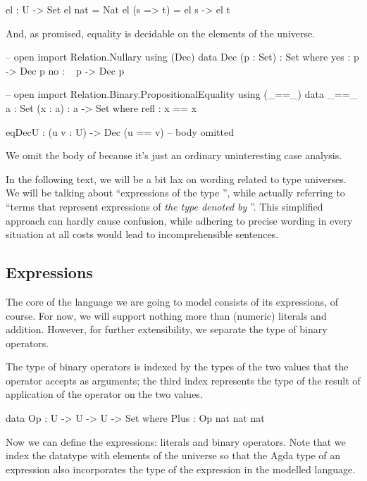 \begin{code}
  el : U -> Set
  el nat = Nat
  el (s => t) = el s -> el t
\end{code}

\noindent And, as promised, equality is decidable on the elements of the
universe.

\begin{code}
  -- open import Relation.Nullary using (Dec)
  data Dec (p : Set) : Set where
    yes : p -> Dec p
    no  : ~ p -> Dec p

  -- open import Relation.Binary.PropositionalEquality using (_==\_)
  data _==\_ {a : Set} (x : a) : a -> Set where
    refl : x == x

  eqDecU : (u v : U) -> Dec (u == v)
  -- body omitted
\end{code}

\noindent We omit the body of  because it's just an ordinary
uninteresting case analysis.

In the following text, we will be a bit lax on wording related to type
universes.  We will be talking about ``expressions of the type '',
while actually referring to ``terms that represent expressions of \emph{the
type denoted by }''. This simplified approach can hardly cause
confusion, while adhering to precise wording in every situation at all costs
would lead to incomprehensible sentences.

\subsection{Expressions}

The core of the language we are going to model consists of its expressions, of
course. For now, we will support nothing more than (numeric) literals and addition.
However, for further extensibility, we separate the type of binary operators.

The type of binary operators is indexed by the types of the two values that
the operator accepts as arguments; the third index represents the type of
the result of application of the operator on the two values.

\begin{code}
  data Op : U -> U -> U -> Set where
    Plus : Op nat nat nat
\end{code}

\noindent Now we can define the expressions: literals and binary operators.
Note that we index the datatype with elements of the universe  so that
the Agda type of an expression also incorporates the type of the expression in
the modelled language.


